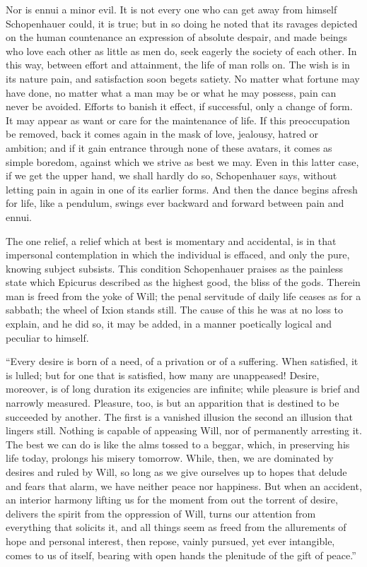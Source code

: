 \documentclass[]{book}
\begin{document}
Nor is ennui a minor evil. It is not every one who can get away from
himself Schopenhauer could, it is true; but in so doing he noted that
its ravages depicted on the human countenance an expression of absolute
despair, and made beings who love each other as little as men do, seek
eagerly the society of each other. In this way, between effort and
attainment, the life of man rolls on. The wish is in its nature pain,
and satisfaction soon begets satiety. No matter what fortune may have
done, no matter what a man may be or what he may possess, pain can never
be avoided. Efforts to banish it effect, if successful, only a change of
form. It may appear as want or care for the maintenance of life. If this
preoccupation be removed, back it comes again in the mask of love,
jealousy, hatred or ambition; and if it gain entrance through none of
these avatars, it comes as simple boredom, against which we strive as
best we may. Even in this latter case, if we get the upper hand, we
shall hardly do so, Schopenhauer says, without letting pain in again in
one of its earlier forms. And then the dance begins afresh for life,
like a pendulum, swings ever backward and forward between pain and
ennui.

The one relief, a relief which at best is momentary and accidental, is
in that impersonal contemplation in which the individual is effaced, and
only the pure, knowing subject subsists. This condition Schopenhauer
praises as the painless state which Epicurus described as the highest
good, the bliss of the gods. Therein man is freed from the yoke of Will;
the penal servitude of daily life ceases as for a sabbath; the wheel of
Ixion stands still. The cause of this he was at no loss to explain, and
he did so, it may be added, in a manner poetically logical and peculiar
to himself.

``Every desire is born of a need, of a privation or of a suffering. When
satisfied, it is lulled; but for one that is satisfied, how many are
unappeased! Desire, moreover, is of long duration its exigencies are
infinite; while pleasure is brief and narrowly measured. Pleasure, too,
is but an apparition that is destined to be succeeded by another. The
first is a vanished illusion the second an illusion that lingers still.
Nothing is capable of appeasing Will, nor of permanently arresting it.
The best we can do is like the alms tossed to a beggar, which, in
preserving his life today, prolongs his misery tomorrow. While, then, we
are dominated by desires and ruled by Will, so long as we give ourselves
up to hopes that delude and fears that alarm, we have neither peace nor
happiness. But when an accident, an interior harmony lifting us for the
moment from out the torrent of desire, delivers the spirit from the
oppression of Will, turns our attention from everything that solicits
it, and all things seem as freed from the allurements of hope and
personal interest, then repose, vainly pursued, yet ever intangible,
comes to us of itself, bearing with open hands the plenitude of the gift
of peace.''
\end{document}
